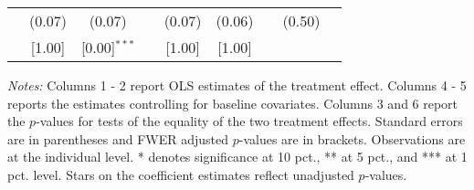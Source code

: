 \begin{table}[htbp]
{\begin{threeparttable}
\begin{tabular}{l*{8}{c}}
          &   (0.07)&   (0.07)&         &   (0.07)&   (0.06)&         &   (0.50)&         \\
          &   [1.00]&[0.00]$^{***}$&         &   [1.00]&   [1.00]&         &         &         \\
\bottomrule \end{tabular} \begin{tablenotes}[flushleft] \footnotesize \item \emph{Notes:} Columns 1 - 2 report OLS estimates of the treatment effect. Columns 4 - 5 reports the estimates controlling for baseline covariates. Columns 3 and 6 report the \(p\)-values for tests of the equality of the two treatment effects. Standard errors are in parentheses and FWER adjusted \(p\)-values are in brackets. Observations are at the individual level. * denotes significance at 10 pct., ** at 5 pct., and *** at 1 pct. level. Stars on the coefficient estimates reflect unadjusted \(p\)-values. \end{tablenotes} \end{threeparttable} } \end{table}


